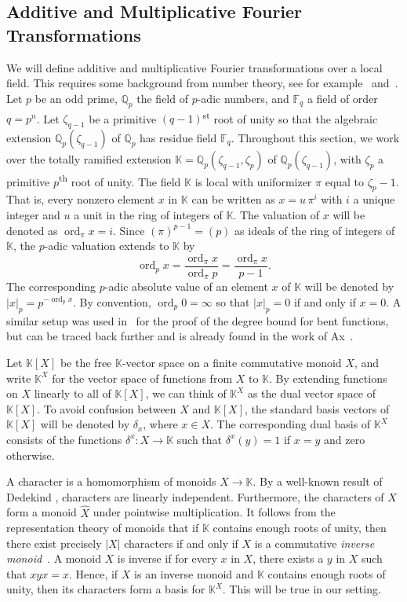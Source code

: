 \documentclass[12pt]{article}
\newcommand{\F}{\mathbb{F}}
\newcommand{\QQ}{\mathbb{Q}}
\newcommand{\K}{\mathbb{K}}
\DeclareMathOperator{\ord}{ord}
\begin{document}
\subsection{Additive and Multiplicative Fourier Transformations}
We will define additive and multiplicative Fourier transformations over a local field. This requires some background from number theory, see for example~\cite[Chapter 1]{lang2012cyclotomic} and~\cite[Chapter 3]{koblitz2012p}.
Let $p$ be an odd prime, $\QQ_p$ the field of $p$-adic numbers, and $\F_q$ a field of order $q = p^n$. Let $\zeta_{q - 1}$ be a primitive $(q-1)$\textsuperscript{st} root of unity so that the algebraic extension $\QQ_p(\zeta_{q - 1})$ of $\QQ_p$ has residue field $\F_q$. Throughout this section, we work over the totally ramified extension $\K = \QQ_p(\zeta_{q - 1}, \zeta_p)$ of $\QQ_p(\zeta_{q - 1})$, with $\zeta_p$ a primitive $p$\textsuperscript{th} root of unity.
The field $\K$ is local with uniformizer $\pi$ equal to $\zeta_p - 1$. That is, every nonzero element $x$ in $\K$ can be written as $x = u\,\pi^i$ with $i$ a unique integer and $u$ a unit in the ring of integers of $\K$. 
The valuation of $x$ will be denoted as $\ord_{\pi} x = i$. Since $(\pi)^{p - 1} = (p)$ as ideals of the ring of integers of $\K$, the $p$-adic valuation extends to $\K$ by
\begin{equation*}
\ord_p x = \frac{\ord_{\pi} x}{\ord_{\pi} p} = \frac{\ord_{\pi} x}{p - 1}.
\end{equation*}
The corresponding $p$-adic absolute value of an element $x$ of $\K$ will be denoted by $|x|_p = p^{-\ord_p x}$.
By convention, $\ord_p 0 = \infty$ so that $|x|_p = 0$ if and only if $x = 0$. A similar setup was used in~\cite{DBLP:journals/ffa/Hou04} for the proof of the degree bound for bent functions, but can be traced back further and is already found in the work of Ax~\cite{ax1964zeroes}.

Let $\K[X]$ be the free $\K$-vector space on a finite commutative monoid $X$, and write $\K^X$ for the vector space of functions from $X$ to $\K$. By extending functions on $X$ linearly to all of $\K[X]$, we can think of $\K^X$ as the dual vector space of $\K[X]$.
To avoid confusion between $X$ and $\K[X]$, the standard basis vectors of $\K[X]$ will be denoted by $\delta_x$, where $x \in X$. The corresponding dual basis of $\K^X$ consists of the functions $\delta^x : X \to \K$ such that $\delta^x(y) = 1$ if $x = y$ and zero otherwise.

A character is a homomorphism of monoids $X \to \K$. By a well-known result of Dedekind \cite[\S44]{Dedekind}, characters are linearly independent. Furthermore, the characters of $X$ form a monoid $\widehat{X}$ under pointwise multiplication. It follows from the representation theory of monoids that if $\K$ contains enough roots of unity, then there exist precisely $|X|$ characters if and only if $X$ is a commutative \emph{inverse monoid}~\cite[\S5.2]{Steinberg2016}. A monoid $X$ is inverse if for every $x$ in $X$, there exists a $y$ in $X$ such that $xyx = x$. Hence, if $X$ is an inverse monoid and $\K$ contains enough roots of unity, then its characters form a basis for $\K^X$. This will be true in our setting.
\end{document}
